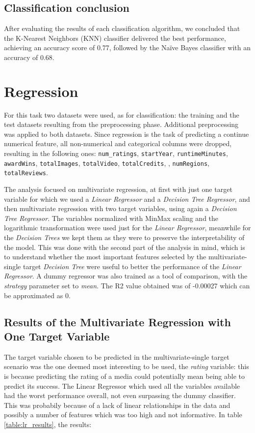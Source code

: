 \documentclass[10pt]{article}
\begin{document}
\subsection{Classification conclusion}
After evaluating the results of each classification algorithm, we concluded that the K-Nearest Neighbors (KNN) classifier delivered the best performance, achieving an accuracy score of 0.77, followed by the Naïve Bayes classifier with an accuracy of 0.68.
\section{Regression}
For this task two datasets were used, as for classification: the training and the test datasets resulting from the preprocessing phase. Additional preprocessing was applied to both datasets. \newline
Since regression is the task of predicting a continue numerical feature, all non-numerical and categorical columns were dropped, resulting in the following ones: \texttt{num\_ratings}, \texttt{startYear}, \texttt{runtimeMinutes}, \texttt{awardWins}, \texttt{totalImages}, \texttt{totalVideo}, \texttt{totalCredits}, \texttt{}, \texttt{numRegions}, \texttt{totalReviews}.

The analysis focused on multivariate regression, at first with just one target variable for which we used a \textit{Linear Regressor} and a \textit{Decision Tree Regressor}, and then multivariate regression with two target variables, using again a \textit{Decision Tree Regressor}.
The variables normalized with MinMax scaling and the logarithmic transformation were used just for the \textit{Linear Regressor}, meanwhile for the \textit{Decision Trees} we kept them as they were to preserve the interpretability of the model. This was done with the second part of the analysis in mind, which is to understand whether the most important features selected by the multivariate-single target \textit{Decision Tree} were useful to better the performance of the \textit{Linear Regressor}. \newline
A dummy regressor was also trained as a tool of comparison, with the \textit{strategy} parameter set to \textit{mean}. The R2 value obtained was of -0.00027 which can be approximated as 0.

\subsection{Results of the Multivariate Regression with One Target Variable}
The target variable chosen to be predicted in the multivariate-single target scenario was the one deemed most interesting to be used, the \textit{rating} variable: this is because predicting the rating of a media could potentially mean being able to predict its success.
The Linear Regressor which used all the variables available had the worst performance overall, not even surpassing the dummy classifier. This was probabily because of a lack of linear relationships in the data and possibly a number of features which was too high and not informative. In table \ref{table:lr_results}, the results:
\end{document}
